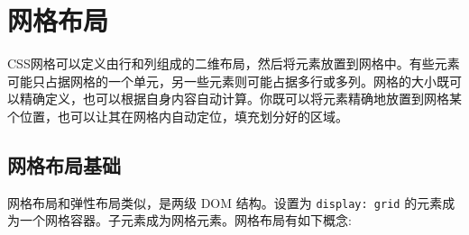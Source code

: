\section{网格布局}

CSS网格可以定义由行和列组成的二维布局，然后将元素放置到网格中。有些元素可能只占据网格的一个单元，另一些元素则可能占据多行或多列。网格的大小既可以精确定义，也可以根据自身内容自动计算。你既可以将元素精确地放置到网格某个位置，也可以让其在网格内自动定位，填充划分好的区域。

\subsection{网格布局基础}

网格布局和弹性布局类似，是两级 DOM 结构。设置为 \texttt{display: grid} 的元素成为一个网格容器。子元素成为网格元素。网格布局有如下概念:


